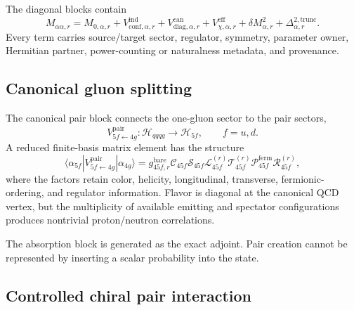 \documentclass[11pt]{article}
\newcommand{\Hil}{\mathcal H}
\newcommand{\cR}{\mathcal R}
\newcommand{\cS}{\mathcal S}
\newcommand{\cT}{\mathcal T}
\newcommand{\cP}{\mathcal P}
\newcommand{\cC}{\mathcal C}
\newcommand{\cL}{\mathcal L}
\newcommand{\eff}{\mathrm{eff}}
\newcommand{\bare}{\mathrm{bare}}
\newcommand{\ind}{\mathrm{ind}}
\newcommand{\trunc}{\mathrm{trunc}}
\newcommand{\Hfour}{\Hil_{qqqg}}
\begin{document}
The diagonal blocks contain
\begin{equation}
 M_{\alpha\alpha,r}
 =M_{0,\alpha,r}
 +V_{\mathrm{conf},\alpha,r}^{\ind}
 +V_{\mathrm{diag},\alpha,r}^{\mathrm{can}}
 +V_{\chi,\alpha,r}^{\eff}
 +\delta M_{\alpha,r}^{2}
 +\Delta_{\alpha,r}^{2,\trunc}.
\end{equation}
Every term carries source/target sector, regulator, symmetry, parameter owner,
Hermitian partner, power-counting or naturalness metadata, and provenance.

\subsection{Canonical gluon splitting}

The canonical pair block connects the one-gluon sector to the pair sectors,
\begin{equation}
 V_{5f\leftarrow4g}^{\mathrm{pair}}
 :\Hfour\longrightarrow\Hil_{5f},
 \qquad f=u,d.
\end{equation}
A reduced finite-basis matrix element has the structure
\begin{equation}
 \langle\alpha_{5f}|
 V_{5f\leftarrow4g}^{\mathrm{pair}}
 |\alpha_{4g}\rangle
 =g_{45f,r}^{\bare}
 \cC_{45f}
 \cS_{45f}
 \cL_{45f}^{(r)}
 \cT_{45f}^{(r)}
 \cP_{45f}^{\mathrm{ferm}}
 \cR_{45f}^{(r)},
 \label{eq:pair-vertex}
\end{equation}
where the factors retain color, helicity, longitudinal, transverse,
fermionic-ordering, and regulator information.  Flavor is diagonal at the
canonical QCD vertex, but the multiplicity of available emitting and spectator
configurations produces nontrivial proton/neutron correlations.

The absorption block is generated as the exact adjoint.  Pair creation cannot
be represented by inserting a scalar probability into the state.

\subsection{Controlled chiral pair interaction}
\end{document}
